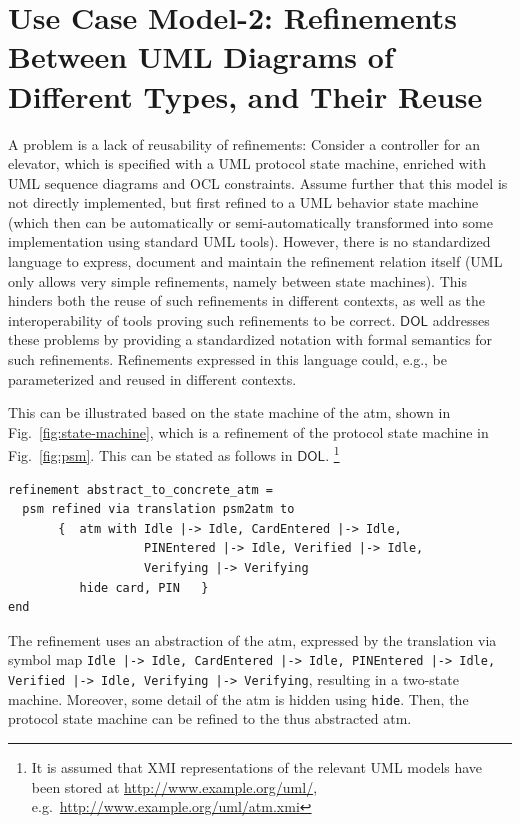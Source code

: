 \documentclass[10pt,fleqn,final]{scrreprt}
\newcommand{\cbs}[0]{\color{red}\xspace} %
\newcommand{\cbe}[0]{\color{black}\xspace} %
\newcommand*{\syntax}[1]{\texttt{#1}}
\newcommand*{\DOL}{\ensuremath{\mathsf{DOL}}\xspace}
\newenvironment{definitions}[0]{\medskip }{}
\newcommand{\uml}[1]{\textsf{#1}}
\begin{document}
\begin{definitions}
\section{Use Case Model-2: Refinements Between UML Diagrams of Different Types, and Their Reuse}
\label{model-2}

A problem is a lack of reusability of refinements: Consider a controller for an elevator, which is specified with a UML protocol state machine, enriched with UML 
sequence diagrams and OCL constraints. Assume further that this model is not directly implemented, but first refined to a UML behavior state machine (which then 
can be automatically or semi-automatically transformed into some implementation using standard UML tools). However, there is no standardized language to 
express, document and maintain the refinement relation itself (UML only allows very simple refinements, namely between state machines). This hinders both the 
reuse of such refinements in different contexts, as well as the interoperability of tools proving such refinements to be correct. \DOL  
addresses these problems by providing a standardized notation with formal semantics for such refinements. Refinements expressed in this language could, e.g., be 
parameterized and reused in different contexts.

\cbs This can be illustrated based on the state
machine of the \uml{atm}, shown in Fig.~\ref{fig:state-machine}, which is a  
refinement of the protocol state machine in Fig.~\ref{fig:psm}. This can be stated as follows in \DOL.\cbe 
\footnote{\cbs  It is assumed that XMI representations of the relevant UML models have been 
stored at \url{http://www.example.org/uml/},
e.g.\ \url{http://www.example.org/uml/atm.xmi} \cbe} 


\begin{lstlisting}[basicstyle=\ttfamily,language=dolText,morekeywords={props,ObjectProperty,Class,DisjointUnionOf,SubClassOf,Characteristics,Transitive,Asymmetric,SubPropertyOf,DisjointClasses,EquivalentTo,inverse,only,forall,iff,if,or,exists,distributed,refinement,library,via},escapechar=@,mathescape]
refinement abstract_to_concrete_atm =
  psm refined via translation psm2atm to 
       {  atm with Idle |-> Idle, CardEntered |-> Idle, 
                   PINEntered |-> Idle, Verified |-> Idle, 
                   Verifying |-> Verifying 
          hide card, PIN   }
end
\end{lstlisting}

The refinement uses an abstraction of the \uml{atm}, expressed by the
translation via symbol map \texttt{Idle |-> Idle, CardEntered |-> Idle, PINEntered |-> Idle, Verified |-> Idle, Verifying |-> Verifying}, resulting in a two-state machine. Moreover, some detail of the \uml{atm} is hidden using
\syntax{hide}. Then, the protocol state machine can be refined to
the thus abstracted \uml{atm}.


\end{definitions}
\end{document}

